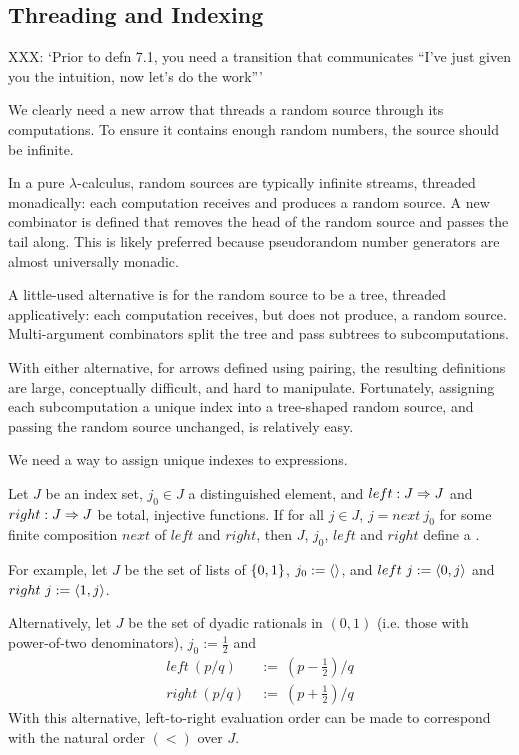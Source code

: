 \documentclass[preprint]{sigplanconf}
\begin{document}
\subsection{Threading and Indexing}

XXX: `Prior to defn 7.1, you need a transition that communicates ``I've just given you the intuition, now let's do the work'''

We clearly need a new arrow that threads a random source through its computations.
To ensure it contains enough random numbers, the source should be infinite.

In a pure $\lambda$-calculus, random sources are typically infinite streams, threaded monadically: each computation receives and produces a random source.
A new combinator is defined that removes the head of the random source and passes the tail along.
This is likely preferred because pseudorandom number generators are almost universally monadic.

A little-used alternative is for the random source to be a tree, threaded applicatively:
each computation receives, but does not produce, a random source.
Multi-argument combinators split the tree and pass subtrees to subcomputations.

With either alternative, for arrows defined using pairing, the resulting definitions are large, conceptually difficult, and hard to manipulate.
Fortunately, assigning each subcomputation a unique index into a tree-shaped random source, and passing the random source unchanged, is relatively easy.

We need a way to assign unique indexes to expressions.

\begin{definition}
Let $J$ be an index set, $j_0 \in J$ a distinguished element, and $left : J \Rightarrow J$ and $right : J \Rightarrow J$ be total, injective functions. If for all $j \in J$, $j = next~j_0$ for some finite composition $next$ of $left$ and $right$, then $J$, $j_0$, $left$ and $right$ define a .
\end{definition}

For example, let $J$ be the set of lists of $\{{0,1}\}$, $j_0 := \langle{}\rangle$, and $left~j := \langle{0,j}\rangle$ and $right~j := \langle{1,j}\rangle$.

Alternatively, let $J$ be the set of dyadic rationals in $(0,1)$ (i.e. those with power-of-two denominators), $j_0 := \tfrac{1}{2}$ and
\begin{equation}
\begin{aligned}
	left~(p/q) &\ := \ (p-\tfrac{1}{2})/q
\\
	right~(p/q) &\ := \ (p+\tfrac{1}{2})/q
\end{aligned}
\end{equation}
With this alternative, left-to-right evaluation order can be made to correspond with the natural order $(<)$ over $J$.
\end{document}
